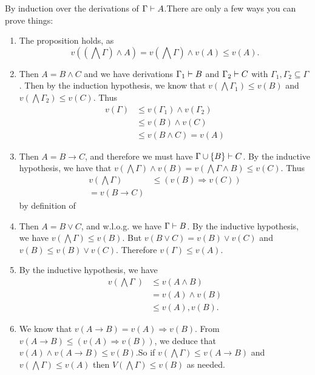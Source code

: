 \documentclass{article}
\numberwithin{thm}{subsection}
\begin{document}
\proof By induction over the derivations of $\Gamma \vdash A$.\gap There are only a few ways you can prove things: \begin{enumerate}
    \item[(Ax)] The proposition holds, as \[v( (\bigwedge \Gamma) \wedge A) = v\left(\bigwedge \Gamma\right) \wedge v(A) \leq v(A).\]
    \item[($\wedge$-I)] Then $A = B \wedge C$ and we have derivations $\Gamma_{1} \vdash B$ and $\Gamma_{2} \vdash C$ with $\Gamma_{1},\Gamma_{2} \subseteq \Gamma$. Then by the induction hypothesis, we know that $v\left(\bigwedge \Gamma_{1}\right) \leq v(B)$ and $v\left( \bigwedge \Gamma_{2} \right) \leq v(C)$. Thus \begin{align*} 
        v(\Gamma) &\leq v(\Gamma_{1}) \wedge v(\Gamma_{2})\\
                  &\leq v(B) \wedge v(C)\\ 
                  &\leq v(B \wedge C) = v(A)
    \end{align*}
    \item[($\to$)-I] Then $A = B \to C$, and therefore we must have $\Gamma \cup \{B\} \vdash C$. By the inductive hypothesis, we have that $v\left(\bigwedge \Gamma \right) \wedge v(B) = v(\bigwedge \Gamma \wedge B) \leq v(C)$. Thus \begin{align*} 
        v\left(\bigwedge \Gamma\right) &\leq (v(B) \Rightarrow v(C))\\
                            = v(B \to C)
    \end{align*}
    by definition of \say{$\Rightarrow$}
    \item[($\vee$)-I] Then $A = B \vee C$, and w.l.o.g. we have $\Gamma \vdash B$. By the inductive hypothesis, we have $v(\bigwedge \Gamma) \leq v(B)$. But $v(B \vee C) = v(B) \vee v(C)$ and $v(B) \leq v(B) \vee v(C)$. Therefore $v(\Gamma) \leq v(A)$.
    \item[($\wedge$)-E] By the inductive hypothesis, we have \begin{align*}
        v\left( \bigwedge \Gamma\ \right) &\leq v(A \wedge B)\\
        &= v(A) \wedge v(B)\\
        &\leq v(A),v(B).
    \end{align*}
    \item[($\to$)-E] We know that $v(A \to B) = v(A) \Rightarrow v(B)$. From $v(A \to B) \leq (v(A) \Rightarrow v(B))$, we deduce that $v(A) \wedge v(A \to B) \leq v(B)$.\gap So if $v\left( \bigwedge \Gamma \right) \leq v(A \to B)$ and $v\left( \bigwedge \Gamma \right) \leq v(A)$ then $V\left( \bigwedge \Gamma \right) \leq v(B)$ as needed.

\end{enumerate}
\end{document}
